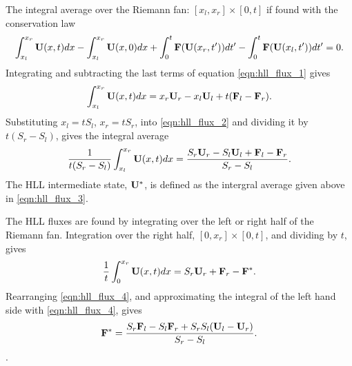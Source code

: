

%
\label{app:hll_flux}

The integral average over the Riemann fan: $[x_l,x_r] \times [0,t]$ if found with the conservation law
\begin{gather}
\label{eqn:hll_flux_1}
\int_{x_l}^{x_r} \mathbf{U}(x,t) dx - \int_{x_l}^{x_r} \mathbf{U}(x,0) dx + \int_{0}^{t} \mathbf{F}(\mathbf{U}(x_r,t')) dt'
- \int_{0}^{t} \mathbf{F}(\mathbf{U}(x_l,t')) dt' = 0.
\end{gather}
Integrating and subtracting the last terms of equation \eqref{eqn:hll_flux_1} gives
\begin{gather}
\label{eqn:hll_flux_2}
\int_{x_l}^{x_r} \mathbf{U}(x,t) dx = x_r\mathbf{U}_r - x_l\mathbf{U}_l + t(\mathbf{F}_l - \mathbf{F}_r).
\end{gather}
Substituting $x_l  = t S_l$, $x_r  = t S_r$, into \eqref{eqn:hll_flux_2} and dividing it by $t(S_r - S_l)$, gives the integral average 
\begin{gather}
\label{eqn:hll_flux_3}
\frac{1}{t(S_r - S_l)}\int_{x_l}^{x_r} \mathbf{U}(x,t) dx = \frac{S_r\mathbf{U}_r - S_l\mathbf{U}_l + \mathbf{F}_l - \mathbf{F}_r}{S_r - S_l}.
\end{gather}
The HLL intermediate state, $\mathbf{U}^*$, is defined as the intergral average given above in \eqref{eqn:hll_flux_3}.

The HLL fluxes are found by integrating over the left or right half of the Riemann fan.  Integration over the right half, $[0,x_r] \times [0,t]$, and dividing by $t$, gives 
\begin{gather}
\label{eqn:hll_flux_4}
\frac{1}{t}\int_{0}^{x_r} \mathbf{U}(x,t) dx = S_r\mathbf{U}_r + \mathbf{F}_r - \mathbf{F}^*.
\end{gather}
Rearranging \eqref{eqn:hll_flux_4}, and approximating the integral of the left hand side with \eqref{eqn:hll_flux_4}, gives
\begin{gather}
\label{eqn:hll_flux_5}
\mathbf{F}^* = \frac{S_r \mathbf{F}_l - S_l \mathbf{F}_r + S_r S_l (\mathbf{U}_l - \mathbf{U}_r) }{S_r - S_l}.
\end{gather}.
